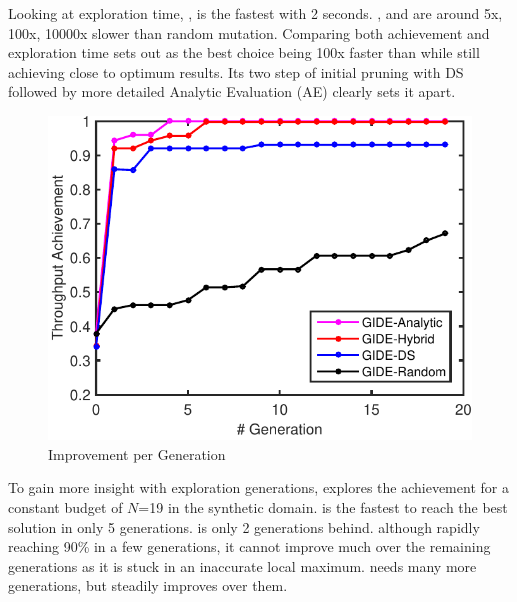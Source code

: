 Looking at exploration time, , \garand is the fastest with 2 seconds. \gads, \gah and \gaana are around 5x, 100x, 10000x slower than random mutation. 
%
Comparing both achievement and exploration time sets out \gah as the best choice being 100x faster than \gaana while still achieving close to optimum results. Its two step of initial pruning with DS followed by more detailed Analytic Evaluation (AE) clearly sets it apart.  


\begingroup
\setlength{\columnsep}{8pt}%

\begin{figure}
	\begin{center}
		\includegraphics[width=\linewidth]{fig/prPAGenSyn.pdf}
	\end{center}
	\caption{Improvement per Generation}
	\label{fig:paGenSyn}
\end{figure}


To gain more insight with exploration generations,  explores the achievement for a constant budget of $N$=19 in the synthetic domain. \gaana is the fastest to reach the best solution in only 5 generations. \gah is only 2 generations behind. \gads although rapidly reaching 90\% in a few generations, it cannot improve much over the remaining generations as it is stuck in an inaccurate local maximum. \garand needs many more generations, but steadily improves over them. 

